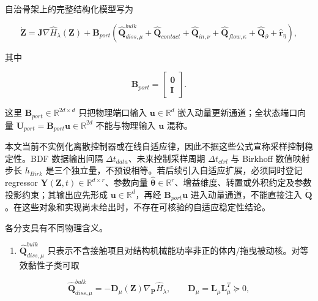 自治骨架上的完整结构化模型写为

\begin{equation}
\label{eq:chnn-4-17}
\boxed{\dot{\mathbf{Z}} = \mathbf{J}\nabla{\widehat{H}}_{\lambda}\left( \mathbf{Z} \right) + \mathbf{B}_{port}\left( {\widehat{\mathbf{Q}}}_{diss,\mu}^{bulk} + {\widehat{\mathbf{Q}}}_{contact} + {\widehat{\mathbf{Q}}}_{in,\nu} + {\widehat{\mathbf{Q}}}_{flow,\kappa} + {\widehat{\mathbf{Q}}}_{\partial} + {\widehat{\mathbf{r}}}_{\eta} \right),}
\end{equation}

其中

\begin{equation}
\label{eq:chnn-4-18}
\mathbf{B}_{port} = \begin{bmatrix}
\mathbf{0} \\
\mathbf{I}
\end{bmatrix}.
\end{equation}

这里 \(\mathbf{B}_{port}\in\mathbb{R}^{2d\times d}\) 只把物理端口输入 \(\mathbf{u}\in\mathbb{R}^{d}\) 嵌入动量更新通道；全状态端口向量 \(\mathbf{U}_{port}=\mathbf{B}_{port}\mathbf{u}\in\mathbb{R}^{2d}\) 不能与物理输入 \(\mathbf{u}\) 混称。

本文当前不实例化离散控制器或在线自适应律，因此不据这些公式宣称采样控制稳定性。BDF 数据输出间隔 \(\Delta t_{data}\)、未来控制采样周期 \(\Delta t_{ctrl}\) 与 Birkhoff 数值映射步长 \(h_{Birk}\) 是三个独立量，不预设相等。若后续引入自适应扩展，必须同时登记 regressor \(\mathbf{Y}(\mathbf{Z},t)\in\mathbb{R}^{d\times r}\)、参数向量 \(\widehat{\bm{\theta}}\in\mathbb{R}^{r}\)、增益维度、转置或外积约定及参数投影约束；其输出应先形成 \(\mathbf{u}\in\mathbb{R}^{d}\)，再经 \(\mathbf{B}_{port}\mathbf{u}\) 进入动量通道，不能直接注入 \(\dot{\mathbf{Q}}\)。在这些对象和实现尚未给出时，不存在可核验的自适应稳定性结论。

各分支具有不同物理含义。

\begin{enumerate}
\def\labelenumi{\arabic{enumi}.}
\tightlist
\item
  \({\widehat{\mathbf{Q}}}_{diss,\mu}^{bulk}\) 只表示不含接触项且对结构机械能功率非正的体内/拖曳被动核。对等效黏性子类可取
\end{enumerate}

\begin{equation}
\label{eq:chnn-4-19}
{\widehat{\mathbf{Q}}}_{diss,\mu}^{bulk} = - \mathbf{D}_{\mu}\left( \mathbf{Z} \right)\nabla_{\mathbf{P}}{\widehat{H}}_{\lambda},\quad\quad\mathbf{D}_{\mu} = \mathbf{L}_{\mu}\mathbf{L}_{\mu}^{T} \succcurlyeq 0,
\end{equation}

